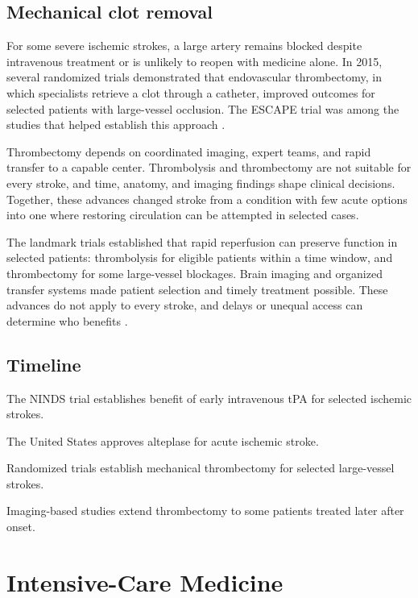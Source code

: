 \documentclass[12pt,oneside]{book}
\begin{document}
\section{Mechanical clot removal}
For some severe ischemic strokes, a large artery remains blocked despite intravenous treatment or is unlikely to reopen with medicine alone. In 2015, several randomized trials demonstrated that endovascular thrombectomy, in which specialists retrieve a clot through a catheter, improved outcomes for selected patients with large-vessel occlusion. The ESCAPE trial was among the studies that helped establish this approach \cite{escapeStrokeTrial}.

Thrombectomy depends on coordinated imaging, expert teams, and rapid transfer
to a capable center. Thrombolysis and thrombectomy are not suitable for every
stroke, and time, anatomy, and imaging findings shape clinical decisions.
Together, these advances changed stroke from a condition with few acute
options into one where restoring circulation can be attempted in selected
cases.

The landmark trials established that rapid reperfusion can preserve function
in selected patients: thrombolysis for eligible patients within a time window,
and thrombectomy for some large-vessel blockages. Brain imaging and organized
transfer systems made patient selection and timely treatment possible. These
advances do not apply to every stroke, and delays or unequal access can
determine who benefits \cite{nindsTpaTrial,escapeStrokeTrial}.

\section*{Timeline}
\begin{description}[leftmargin=2.3cm,style=nextline]
  \item[1995] The NINDS trial establishes benefit of early intravenous tPA for selected ischemic strokes.
  \item[1996] The United States approves alteplase for acute ischemic stroke.
  \item[2015] Randomized trials establish mechanical thrombectomy for selected large-vessel strokes.
  \item[2018] Imaging-based studies extend thrombectomy to some patients treated later after onset.
\end{description}
\chapter[Intensive-Care Medicine]{Intensive-Care Medicine}
\end{document}
